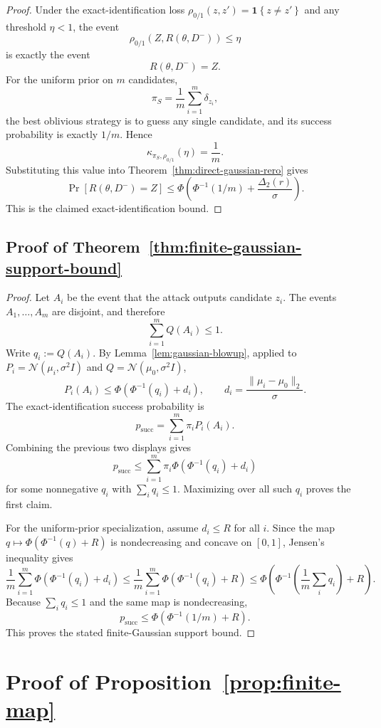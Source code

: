 \documentclass[conference,compsoc]{IEEEtran}
\newcommand{\ind}[1]{\mathbf{1}\!\left\{#1\right\}}
\begin{document}
\begin{proof}
Under the exact-identification loss $\rho_{0/1}(z,z')=\ind{z\neq z'}$ and any threshold $\eta<1$, the event
\[
\rho_{0/1}(Z,R(\theta,D^-))\le \eta
\]
is exactly the event
\[
R(\theta,D^-)=Z.
\]
For the uniform prior on $m$ candidates,
\[
\pi_S=\frac{1}{m}\sum_{i=1}^m \delta_{z_i},
\]
the best oblivious strategy is to guess any single candidate, and its success probability is exactly $1/m$. Hence
\[
\kappa_{\pi_S,\rho_{0/1}}(\eta)=\frac{1}{m}.
\]
Substituting this value into Theorem~\ref{thm:direct-gaussian-rero} gives
\[
\Pr[R(\theta,D^-)=Z]
\le
\Phi\!\left(\Phi^{-1}(1/m)+\frac{\Delta_2(r)}{\sigma}\right).
\]
This is the claimed exact-identification bound.
\end{proof}

\subsection{Proof of Theorem~\ref{thm:finite-gaussian-support-bound}}

\begin{proof}
Let $A_i$ be the event that the attack outputs candidate $z_i$. The events $A_1,\ldots,A_m$ are disjoint, and therefore
\[
\sum_{i=1}^m Q(A_i)\le 1.
\]
Write $q_i:=Q(A_i)$. By Lemma~\ref{lem:gaussian-blowup}, applied to $P_i=\mathcal N(\mu_i,\sigma^2 I)$ and $Q=\mathcal N(\mu_0,\sigma^2 I)$,
\[
P_i(A_i)\le \Phi\!\left(\Phi^{-1}(q_i)+d_i\right),
\qquad
 d_i=\frac{\|\mu_i-\mu_0\|_2}{\sigma}.
\]
The exact-identification success probability is
\[
p_{\mathrm{succ}}=\sum_{i=1}^m \pi_i P_i(A_i).
\]
Combining the previous two displays gives
\[
p_{\mathrm{succ}}
\le
\sum_{i=1}^m \pi_i\Phi\!\left(\Phi^{-1}(q_i)+d_i\right)
\]
for some nonnegative $q_i$ with $\sum_i q_i\le 1$. Maximizing over all such $q_i$ proves the first claim.

For the uniform-prior specialization, assume $d_i\le R$ for all $i$. Since the map $q\mapsto \Phi(\Phi^{-1}(q)+R)$ is nondecreasing and concave on $[0,1]$, Jensen's inequality gives
\[
\frac{1}{m}\sum_{i=1}^m
\Phi\!\left(\Phi^{-1}(q_i)+d_i\right)
\le
\frac{1}{m}\sum_{i=1}^m
\Phi\!\left(\Phi^{-1}(q_i)+R\right)
\le
\Phi\!\left(\Phi^{-1}\!\left(\frac{1}{m}\sum_i q_i\right)+R\right).
\]
Because $\sum_i q_i\le 1$ and the same map is nondecreasing,
\[
p_{\mathrm{succ}}
\le
\Phi\!\left(\Phi^{-1}(1/m)+R\right).
\]
This proves the stated finite-Gaussian support bound.
\end{proof}


\section{Proof of Proposition~\ref{prop:finite-map}}
\label{app:proof-finite-map}
\end{document}
